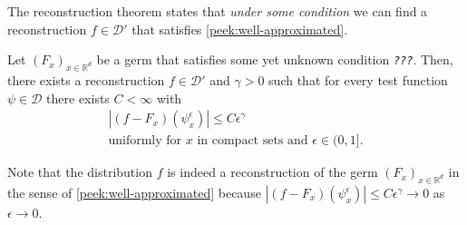 The reconstruction theorem states that \emph{under some condition} we can find a reconstruction $f \in \mathcal{D}'$ that satisfies \eqref{peek:well-approximated}.

\begin{conjecture}\label{peek:conjecture}
    Let $(F_x)_{x \in \mathbb{R}^d}$ be a germ that satisfies some yet unknown condition \emph{\texttt{???}}. Then, there exists a reconstruction $f \in \mathcal{D}'$ and $\gamma > 0$ such that for every test function $\psi \in \mathcal{D}$ there exists $C < \infty$ with
    \begin{gather}\label{peek:eq:conjecture}
        |(f-F_x)(\psi^\epsilon_x)| \leq C \epsilon^{\gamma} \\
        \text{uniformly for $x$ in compact sets and $\epsilon \in (0,1]$} \nonumber.
    \end{gather}
    
\end{conjecture}

Note that the distribution $f$ is indeed a reconstruction of the germ $(F_x)_{x \in \mathbb{R}^d}$ in the sense of \eqref{peek:well-approximated} because $|(f-F_x)(\psi^\epsilon_x)| \leq C  \epsilon^{\gamma} \to 0$ as $\epsilon \to 0$.

\vspace{0.4cm} 

